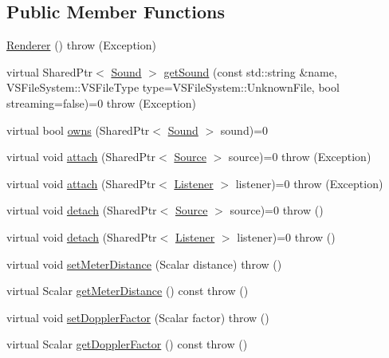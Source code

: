 \subsection*{Public Member Functions}
\begin{DoxyCompactItemize}
\item 
\hyperlink{classAudio_1_1Renderer_acb466bef9afd94db0ea11789a5d9a6af}{Renderer} ()  throw (\+Exception)
\item 
virtual Shared\+Ptr$<$ \hyperlink{classAudio_1_1Sound}{Sound} $>$ \hyperlink{classAudio_1_1Renderer_a540813191ac8b7e8fac070f15e7c1203}{get\+Sound} (const std\+::string \&name, V\+S\+File\+System\+::\+V\+S\+File\+Type type=V\+S\+File\+System\+::\+Unknown\+File, bool streaming=false)=0  throw (\+Exception)
\item 
virtual bool \hyperlink{classAudio_1_1Renderer_af0626584595b61d0dd7aecbee7b33105}{owns} (Shared\+Ptr$<$ \hyperlink{classAudio_1_1Sound}{Sound} $>$ sound)=0
\item 
virtual void \hyperlink{classAudio_1_1Renderer_a665f4e39af62afd9468ab1659b8d6778}{attach} (Shared\+Ptr$<$ \hyperlink{classAudio_1_1Source}{Source} $>$ source)=0  throw (\+Exception)
\item 
virtual void \hyperlink{classAudio_1_1Renderer_aa653cb44aee16f2de56cfd9624e86de6}{attach} (Shared\+Ptr$<$ \hyperlink{classAudio_1_1Listener}{Listener} $>$ listener)=0  throw (\+Exception)
\item 
virtual void \hyperlink{classAudio_1_1Renderer_a9db43622e827ecb0ffec8809975e3d70}{detach} (Shared\+Ptr$<$ \hyperlink{classAudio_1_1Source}{Source} $>$ source)=0  throw ()
\item 
virtual void \hyperlink{classAudio_1_1Renderer_a9c02e21440c41266752a9f058ee5fe23}{detach} (Shared\+Ptr$<$ \hyperlink{classAudio_1_1Listener}{Listener} $>$ listener)=0  throw ()
\item 
virtual void \hyperlink{classAudio_1_1Renderer_ae504ccc3aad486fd43ea5a29c4925e4b}{set\+Meter\+Distance} (Scalar distance)  throw ()
\item 
virtual Scalar \hyperlink{classAudio_1_1Renderer_a3848728d36797267820238d6dee67f72}{get\+Meter\+Distance} () const   throw ()
\item 
virtual void \hyperlink{classAudio_1_1Renderer_af8f874c06faff24928a4f7504208d353}{set\+Doppler\+Factor} (Scalar factor)  throw ()
\item 
virtual Scalar \hyperlink{classAudio_1_1Renderer_ab7ef8fe4e36d773584fec8c97f1c2d56}{get\+Doppler\+Factor} () const   throw ()
\item 

\end{DoxyCompactItemize}
